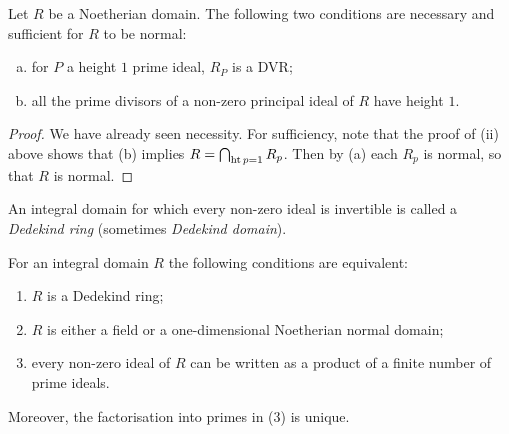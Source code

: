 \begin{corollary*}
Let $R$ be a Noetherian domain. The following two conditions
are necessary and sufficient for $R$ to be normal:
\begin{enumerate}[(a)]
  \item for $P$ a height $1$ prime ideal, $R_P$ is a DVR;
  \item all the prime divisors of a non-zero principal ideal of $R$ have height $1$.
\end{enumerate}
\end{corollary*}

\begin{proof}
We have already seen necessity. For sufficiency, note that the proof
of (ii) above shows that (b) implies $R = \bigcap_{\operatorname{ht} p = 1} R_p$. Then by (a) each $R_p$
is normal, so that $R$ is normal.
\end{proof}

\begin{definition}
An integral domain for which every non-zero ideal is invertible
is called a \emph{Dedekind ring} (sometimes \emph{Dedekind domain}).
\end{definition}

\begin{theorem}\label{thm:11.6}
For an integral domain $R$ the following conditions are
equivalent:
\begin{enumerate}[(1)]
  \item $R$ is a Dedekind ring;
  \item $R$ is either a field or a one-dimensional Noetherian normal domain;
  \item every non-zero ideal of $R$ can be written as a product of a finite
        number of prime ideals.
\end{enumerate}
Moreover, the factorisation into primes in (3) is unique.
\end{theorem}

